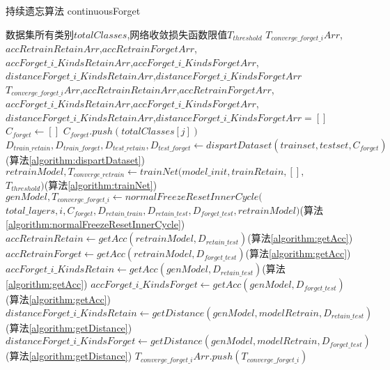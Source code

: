 \begin{algorithm}
	\renewcommand{\algorithmicrequire}{\textbf{Input:}}
	\renewcommand{\algorithmicensure}{\textbf{Output:}}
	\caption{持续遗忘算法 continuousForget}
	\label{algorithm:continuousForget}
	\begin{algorithmic}[1]
        \REQUIRE 数据集所有类别$totalClasses$,网络收敛损失函数限值$T_{threshold}$
        \ENSURE  $T_{converge\_forget\_i}Arr$,$accRetrainRetainArr$,$accRetrainForgetArr$,\\$accForget\_i\_KindsRetainArr$,$accForget\_i\_KindsForgetArr$,\\$distanceForget\_i\_KindsRetainArr$,$distanceForget\_i\_KindsForgetArr$
        \STATE $T_{converge\_forget\_i}Arr$,$accRetrainRetainArr$,$accRetrainForgetArr$,\\$accForget\_i\_KindsRetainArr$,$accForget\_i\_KindsForgetArr$,\\$distanceForget\_i\_KindsRetainArr$,$distanceForget\_i\_KindsForgetArr$$ = []$
            \STATE $C_{forget} \gets []$
                \STATE $C_{forget}.push(totalClasses[j])$
            \ENDFOR
            \STATE $D_{train\_retain},D_{train\_forget},D_{test\_retain},D_{test\_forget} \gets dispartDataset(trainset, testset, C_{forget})$(算法\ref{algorithm:dispartDataset})
            \STATE $retrainModel,T_{converge\_retrain} \gets trainNet(model\_init, trainRetain, [],$ \\ $ T_{threshold})$(算法\ref{algorithm:trainNet})
            \STATE $genModel, T_{converge\_forget\_i} \gets normalFreezeResetInnerCycle($\\$total\_layers, i, C_{forget},D_{retain\_train},D_{retain\_test}, D_{forget\_test},retrainModel )$(算法\ref{algorithm:normalFreezeResetInnerCycle})
            \STATE $accRetrainRetain \gets getAcc(retrainModel, D_{retain\_test})$(算法\ref{algorithm:getAcc})
            \STATE $accRetrainForget  \gets getAcc(retrainModel, D_{forget\_test})$(算法\ref{algorithm:getAcc})
            \STATE $accForget\_i\_KindsRetain \gets getAcc(genModel, D_{retain\_test})$(算法\ref{algorithm:getAcc})
            \STATE $accForget\_i\_KindsForget  \gets getAcc(genModel, D_{forget\_test})$(算法\ref{algorithm:getAcc})
            \STATE $distanceForget\_i\_KindsRetain \gets getDistance(genModel, modelRetrain,D_{retain\_test})$(算法\ref{algorithm:getDistance})
            \STATE $distanceForget\_i\_KindsForget \gets getDistance(genModel, modelRetrain, D_{forget\_test})$(算法\ref{algorithm:getDistance})
            \STATE $T_{converge\_forget\_i}Arr.push(T_{converge\_forget\_i})$
$$
\end{algorithmic}
\end{algorithm}

